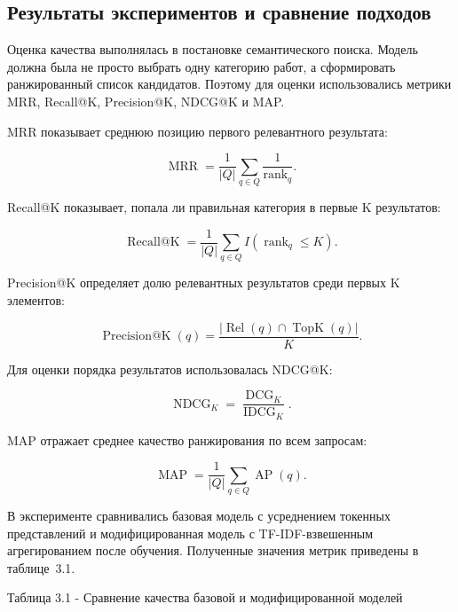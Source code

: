\documentclass[14pt,a4paper]{extarticle}
\renewcommand{\textbf}[1]{#1}
\numberwithin{figure}{section}
\numberwithin{table}{section}
\begin{document}
\subsection{Результаты экспериментов и сравнение
подходов}

Оценка качества выполнялась в постановке семантического поиска. Модель
должна была не просто выбрать одну категорию работ, а сформировать
ранжированный список кандидатов. Поэтому для оценки использовались
метрики MRR, Recall@K, Precision@K, NDCG@K и MAP.

MRR показывает среднюю позицию первого релевантного результата:

\begin{equation}
\operatorname{MRR}=\frac{1}{|Q|}\sum_{q\in Q}\frac{1}{\operatorname{rank}_{q}}.
\end{equation}

Recall@K показывает, попала ли правильная категория в первые K
результатов:

\begin{equation}
\operatorname{Recall@K}=\frac{1}{|Q|}\sum_{q\in Q}I\left(\operatorname{rank}_{q}\leq K\right).
\end{equation}

Precision@K определяет долю релевантных результатов среди первых K
элементов:

\begin{equation}
\operatorname{Precision@K}(q)=\frac{|\operatorname{Rel}(q)\cap\operatorname{TopK}(q)|}{K}.
\end{equation}

Для оценки порядка результатов использовалась NDCG@K:

\begin{equation}
\operatorname{NDCG}_{K}=\frac{\operatorname{DCG}_{K}}{\operatorname{IDCG}_{K}}.
\end{equation}

MAP отражает среднее качество ранжирования по всем запросам:

\begin{equation}
\operatorname{MAP}=\frac{1}{|Q|}\sum_{q\in Q}\operatorname{AP}(q).
\end{equation}

В эксперименте сравнивались базовая модель с усреднением токенных представлений и
модифицированная модель с TF-IDF-взвешенным агрегированием после обучения.
Полученные значения метрик приведены в таблице~3.1.

\textbf{Таблица 3.1 - Сравнение качества базовой и модифицированной моделей}
\end{document}
